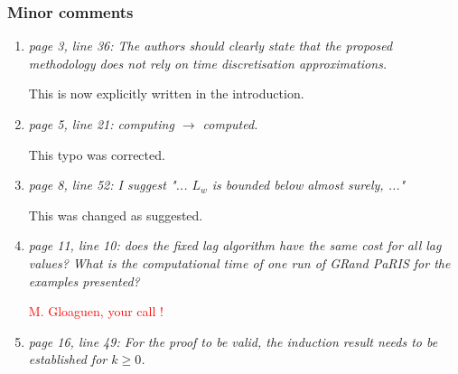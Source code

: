 \documentclass[12pt]{article}
\newcommand{\1}{\mathrm{1}}
\begin{document}
\subsubsection*{Minor comments}
\begin{enumerate}
\item{\em page 3, line 36: The authors should clearly state that the proposed methodology
does not rely on time discretisation approximations.}

\vspace{.3cm}

This is now explicitly written in the introduction.

\item{\em page 5, line 21: computing $\longrightarrow$ computed.}

\vspace{.3cm}

This typo was corrected.

\item {\em page 8, line 52: I suggest "... $L_w$ is bounded below almost surely, ..."}

\vspace{.3cm}

This was changed as suggested.

\item {\em page 11, line 10: does the fixed lag algorithm have the same cost for all lag values?
What is the computational time of one run of GRand PaRIS for the examples presented?}

\vspace{.3cm}

\textcolor{red}{M. Gloaguen, your call !}

\item {\em page 16, line 49: For the proof to be valid, the induction result needs to be established for $k\ge 0$.}

\vspace{.3cm}

\end{enumerate}
\end{document}

